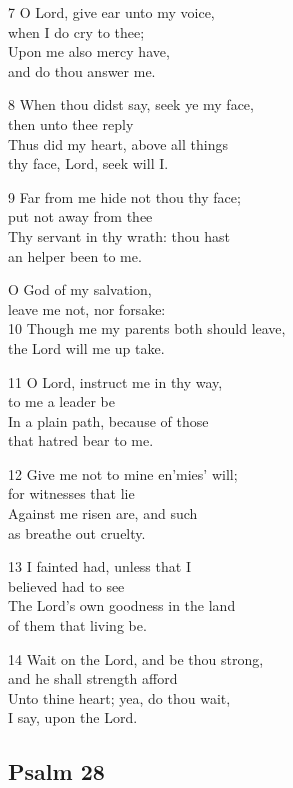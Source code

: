 \begin{multicols}{3}
7 O Lord, give ear unto my voice,\\
when I do cry to thee;\\
Upon me also mercy have,\\
and do thou answer me.

8 When thou didst say, seek ye my face,\\
then unto thee reply\\
Thus did my heart, above all things\\
thy face, Lord, seek will I.

9 Far from me hide not thou thy face;\\
put not away from thee\\
Thy servant in thy wrath: thou hast\\
an helper been to me.

O God of my salvation,\\
leave me not, nor forsake:\\
10 Though me my parents both should leave,\\
the Lord will me up take.

11 O Lord, instruct me in thy way,\\
to me a leader be\\
In a plain path, because of those\\
that hatred bear to me.

12 Give me not to mine en’mies’ will;\\
for witnesses that lie\\
Against me risen are, and such\\
as breathe out cruelty.

13 I fainted had, unless that I\\
believed had to see\\
The Lord’s own goodness in the land\\
of them that living be.

14 Wait on the Lord, and be thou strong,\\
and he shall strength afford\\
Unto thine heart; yea, do thou wait,\\
I say, upon the Lord.

\begin{center}
\quad{}\quad{}
\end{center}

\subsection*{Psalm 28 }


\end{multicols}
